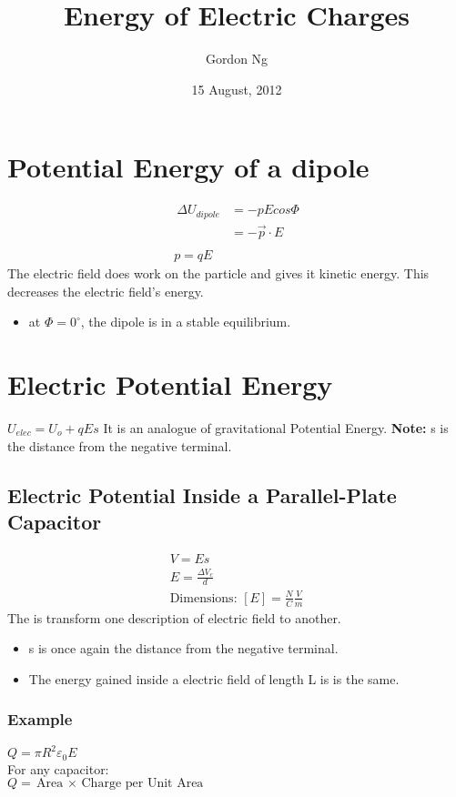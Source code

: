 \documentclass[12pt]{article}
\begin{document}
\title{Energy of Electric Charges}
\date{15 August, 2012}
\author{Gordon Ng}
\maketitle

\pagebreak
\tableofcontents
\pagebreak
\section{Potential Energy of a dipole}
\begin{align}\
\Delta U_{dipole} &= - pE cos \Phi \\
&= -\vec{p} \cdot E \\ \\
p = qE
\end{align}
The electric field does work on the particle and gives it kinetic energy. This decreases the electric field's energy. 
\begin{itemize}
\item at $\Phi = 0^{\circ}$, the dipole is in a stable equilibrium.
\end{itemize}
\section{Electric Potential Energy}
$U_{elec}=U_o+qEs$
It is an analogue of gravitational Potential Energy.
\textbf{Note:} s is the distance from the negative terminal.
\subsection{Electric Potential Inside a Parallel-Plate Capacitor}
\begin{align}
V=Es \\
E = \frac{\Delta V_c}{d} \\
\text{Dimensions: }
[E]= \frac{N}{C}\frac{V}{m}
\end{align}
The is transform one description of electric field to another.
\begin{itemize}
\item s is once again the distance from the negative terminal.
\item The energy gained inside a electric field of length L is is the same.
\end{itemize}
\subsubsection{Example}
$Q= \pi R^2 \varepsilon_0 E$ \\
For any capacitor: \\
$Q=\text{Area $\times$ Charge per Unit Area}$
\pagebreak
\end{document}
